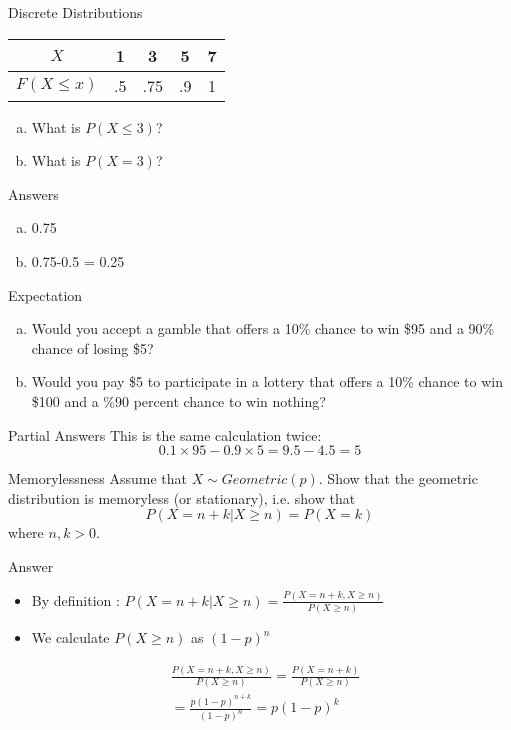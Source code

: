 \documentclass[14pt]{beamer}
\begin{document}
\begin{frame}{Discrete Distributions}
\begin{table}
\begin{tabular}{|c||c|c|c|c|}
\hline
$X$ 				&	1	&	3	&	5	&	7	\\
\hline
$F(X \leq x)$	&	.5	&	.75	&	.9	&	1	\\
\hline
\end{tabular}
\end{table}
\begin{enumerate}[a)]
\item What is $ P(X \leq 3) $?
\item What is $ P(X = 3) $?
\end{enumerate}
\end{frame}

\begin{frame}{Answers}
\begin{enumerate}[a)]
\item 0.75
\item 0.75-0.5 = 0.25
\end{enumerate}
\end{frame}

\begin{frame}{Expectation}
\begin{enumerate}[a)]
\item Would you accept a gamble that offers a 10\% chance to win \$95 and a 90\% chance of losing \$5?
\item Would you pay \$5 to participate in a lottery that offers a 10\% chance to win \$100 and a \%90
percent chance to win nothing?
\end{enumerate}
\end{frame}

\begin{frame}{Partial Answers}
This is the same calculation twice:
$$ 0.1 \times 95 - 0.9 \times 5 = 9.5 - 4.5 = 5 $$
\end{frame}

\begin{frame}{Memorylessness}
Assume that $ X \sim Geometric(p) $. Show that the geometric distribution is memoryless (or stationary), i.e.
show that 
$$ P(X = n + k | X \geq n) = P(X = k) $$
where $ n,k > 0 $.
\end{frame}

\begin{frame}{Answer}
\begin{itemize}
\item By definition : $ P(X = n + k | X \geq n) = \frac{P(X = n + k, X \geq n)}{P(X \geq n)} $
\item We calculate $ P(X \geq n) $ as $ (1-p)^{n} $
\end{itemize}
\begin{align*}
&\frac{P(X = n + k, X \geq n)}{P(X \geq n)} = \frac{P(X = n + k)}{P(X \geq n)} \\
&= \frac{p(1-p)^{n+k}}{(1-p)^{n}} = p(1-p)^{k}
\end{align*}
\end{frame}
\end{document}
